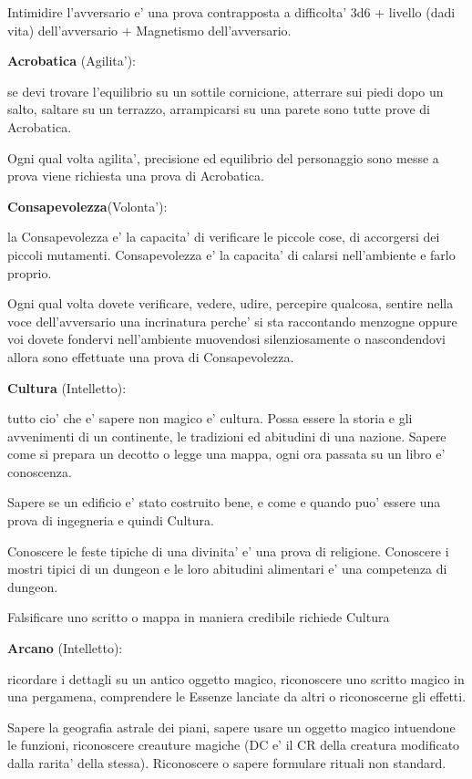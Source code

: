 \documentclass[a4paper,11pt,twoside,openany]{book}
\begin{document}
Intimidire l'avversario e' una prova contrapposta a difficolta' 3d6 + livello (dadi vita) dell'avversario + Magnetismo dell'avversario.

\textbf{Acrobatica} (Agilita'):

se devi trovare l'equilibrio su un sottile cornicione, atterrare sui piedi dopo un salto, saltare su un terrazzo, arrampicarsi su una parete sono tutte prove di Acrobatica.

Ogni qual volta agilita', precisione ed equilibrio del personaggio sono messe a prova viene richiesta una prova di Acrobatica.

\textbf{Consapevolezza}(Volonta'):

la Consapevolezza e' la capacita' di verificare le piccole cose, di accorgersi dei piccoli mutamenti. Consapevolezza e' la capacita' di calarsi nell'ambiente e farlo proprio.

Ogni qual volta dovete verificare, vedere, udire, percepire qualcosa, sentire nella voce dell'avversario una incrinatura perche' si sta raccontando menzogne oppure voi dovete fondervi nell'ambiente muovendosi silenziosamente o nascondendovi allora sono effettuate una prova di Consapevolezza.

\textbf{Cultura} (Intelletto):

tutto cio' che e' sapere non magico e' cultura. Possa essere la storia e gli avvenimenti di un continente, le tradizioni ed abitudini di una nazione. Sapere come si prepara un decotto o legge una mappa, ogni ora passata su un libro e' conoscenza.

Sapere se un edificio e' stato costruito bene, e come e quando puo' essere una prova di ingegneria e quindi Cultura.

Conoscere le feste tipiche di una divinita' e' una prova di religione. Conoscere i mostri tipici di un dungeon e le loro abitudini alimentari e' una competenza di dungeon.

Falsificare uno scritto o mappa in maniera credibile richiede Cultura

\textbf{Arcano} (Intelletto):

ricordare i dettagli su un antico oggetto magico, riconoscere uno scritto magico in una pergamena, comprendere le Essenze lanciate da altri o riconoscerne gli effetti.

Sapere la geografia astrale dei piani, sapere usare un oggetto magico intuendone le funzioni, riconoscere creauture magiche (DC e' il CR della creatura modificato dalla rarita' della stessa). Riconoscere o sapere formulare rituali non standard.
\end{document}
